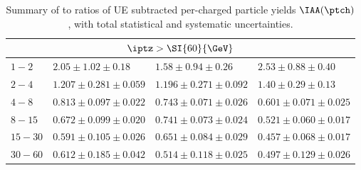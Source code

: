 \begin{table}[!ht]
\begin{center}
\begin{tabular}{|l|l|l|l|}
\hline \hline
\multicolumn{4}{|c|}{\small {$\iptz > \SI{60}{\GeV}$}} \\ \hline
\footnotesize {$1 - 2$} & \footnotesize {$2.05 \pm 1.02 \pm 0.18$}  & \footnotesize {$1.58 \pm 0.94 \pm 0.26$}  & \footnotesize {$2.53 \pm 0.88 \pm 0.40$}  \\
\footnotesize {$2 - 4$} & \footnotesize {$1.207 \pm 0.281 \pm 0.059$}  & \footnotesize {$1.196 \pm 0.271 \pm 0.092$}  & \footnotesize {$1.40 \pm 0.29 \pm 0.13$}  \\
\footnotesize {$4 - 8$} & \footnotesize {$0.813 \pm 0.097 \pm 0.022$}  & \footnotesize {$0.743 \pm 0.071 \pm 0.026$}  & \footnotesize {$0.601 \pm 0.071 \pm 0.025$}  \\
\footnotesize {$8 - 15$} & \footnotesize {$0.672 \pm 0.099 \pm 0.020$}  & \footnotesize {$0.741 \pm 0.073 \pm 0.024$}  & \footnotesize {$0.521 \pm 0.060 \pm 0.017$}  \\
\footnotesize {$15 - 30$} & \footnotesize {$0.591 \pm 0.105 \pm 0.026$}  & \footnotesize {$0.651 \pm 0.084 \pm 0.029$}  & \footnotesize {$0.457 \pm 0.068 \pm 0.017$}  \\
\footnotesize {$30 - 60$} & \footnotesize {$0.612 \pm 0.185 \pm 0.042$}  & \footnotesize {$0.514 \pm 0.118 \pm 0.025$}  & \footnotesize {$0.497 \pm 0.129 \pm 0.026$}  \\
\hline
\end{tabular}
\caption{Summary of \PbPb to \pp ratios of UE subtracted per-\Zboson charged particle yields $\IAA (\ptch)$, with total statistical and systematic uncertainties.}
\label{tab3}
\end{center}
\end{table}
